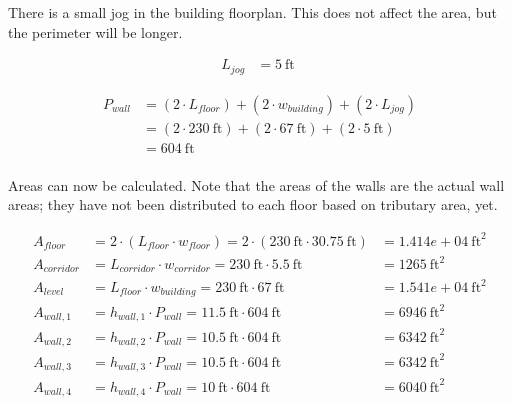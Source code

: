 \documentclass[11pt]{article}
\begin{document}
    
    There is a small jog in the building floorplan. This does not affect the
area, but the perimeter will be longer.

    \begin{equation*}
\begin{aligned}
L_{jog} &= 5\ \mathrm{ft} \;
\end{aligned}
\end{equation*}

    
    \begin{equation*}
\begin{aligned}
P_{wall} &= \left( 2 \cdot L_{floor} \right) + \left( 2 \cdot w_{building} \right) + \left( 2 \cdot L_{jog} \right) \\&= \left( 2 \cdot 230\ \mathrm{ft} \right) + \left( 2 \cdot 67\ \mathrm{ft} \right) + \left( 2 \cdot 5\ \mathrm{ft} \right) \\&= 604\ \mathrm{ft}  \\
\end{aligned}
\end{equation*}

    
    Areas can now be calculated. Note that the areas of the walls are the
actual wall areas; they have not been distributed to each floor based on
tributary area, yet.

    \begin{equation*}
\begin{aligned}
A_{floor} &= 2 \cdot \left( L_{floor} \cdot w_{floor} \right)  = 2 \cdot \left( 230\ \mathrm{ft} \cdot 30.75\ \mathrm{ft} \right) &= 1.414e+04\ \mathrm{ft}^{2}  
\\
A_{corridor} &= L_{corridor} \cdot w_{corridor}  = 230\ \mathrm{ft} \cdot 5.5\ \mathrm{ft} &= 1265\ \mathrm{ft}^{2}  
\\
A_{level} &= L_{floor} \cdot w_{building}  = 230\ \mathrm{ft} \cdot 67\ \mathrm{ft} &= 1.541e+04\ \mathrm{ft}^{2}  
\\
A_{wall,1} &= h_{wall,1} \cdot P_{wall}  = 11.5\ \mathrm{ft} \cdot 604\ \mathrm{ft} &= 6946\ \mathrm{ft}^{2}  
\\
A_{wall,2} &= h_{wall,2} \cdot P_{wall}  = 10.5\ \mathrm{ft} \cdot 604\ \mathrm{ft} &= 6342\ \mathrm{ft}^{2}  
\\
A_{wall,3} &= h_{wall,3} \cdot P_{wall}  = 10.5\ \mathrm{ft} \cdot 604\ \mathrm{ft} &= 6342\ \mathrm{ft}^{2}  
\\
A_{wall,4} &= h_{wall,4} \cdot P_{wall}  = 10\ \mathrm{ft} \cdot 604\ \mathrm{ft} &= 6040\ \mathrm{ft}^{2}  
\end{aligned}
\end{equation*}
\end{document}
